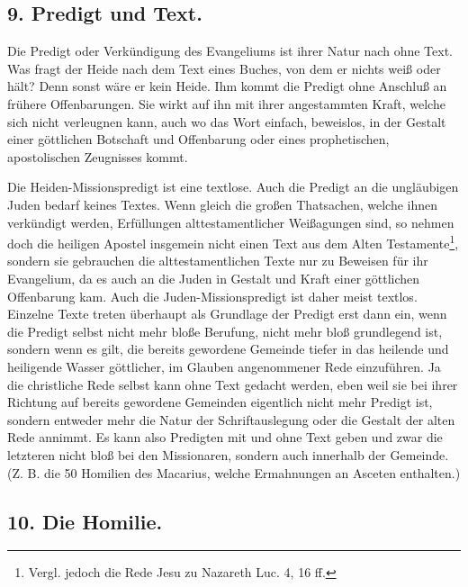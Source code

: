 \subsection*{9. Predigt und Text.}

Die Predigt oder Verkündigung des Evangeliums ist ihrer Natur nach ohne Text. Was fragt der Heide nach dem Text eines Buches, von dem er nichts weiß oder hält? Denn sonst wäre er kein Heide. Ihm kommt die Predigt ohne Anschluß an frühere Offenbarungen. Sie wirkt auf ihn mit ihrer
angestammten Kraft, welche sich nicht verleugnen kann, auch wo das Wort einfach, beweislos, in der Gestalt einer göttlichen Botschaft und Offenbarung oder eines prophetischen, apostolischen Zeugnisses kommt.

Die Heiden-Missionspredigt ist eine textlose. Auch die Predigt an die ungläubigen Juden bedarf keines Textes. Wenn gleich die großen Thatsachen, welche ihnen verkündigt werden, Erfüllungen alttestamentlicher Weißagungen sind, so nehmen doch die heiligen Apostel insgemein nicht einen Text aus dem Alten Testamente\footnote{Vergl. jedoch die Rede Jesu zu Nazareth Luc. 4, 16 ff.}, sondern sie gebrauchen die alttestamentlichen Texte nur zu Beweisen für ihr Evangelium, da es auch an die Juden in Gestalt und Kraft einer göttlichen Offenbarung kam. Auch die Juden-Missionspredigt ist daher meist textlos. Einzelne Texte treten überhaupt als Grundlage der Predigt erst dann ein, wenn die Predigt selbst nicht mehr bloße Berufung, nicht mehr bloß grundlegend ist, sondern wenn es gilt, die bereits gewordene Gemeinde tiefer in das heilende und heiligende Wasser göttlicher, im Glauben angenommener Rede einzuführen. Ja die christliche Rede selbst kann ohne Text gedacht werden, eben weil sie bei ihrer Richtung auf bereits gewordene Gemeinden eigentlich nicht mehr Predigt ist, sondern entweder mehr die Natur der Schriftauslegung oder die Gestalt der alten Rede annimmt. Es kann also Predigten mit und ohne Text geben und zwar die letzteren nicht bloß bei den Missionaren, sondern auch innerhalb
der Gemeinde. (Z. B. die 50 Homilien des Macarius, welche Ermahnungen an Asceten enthalten.)

\subsection*{10. Die Homilie.}

